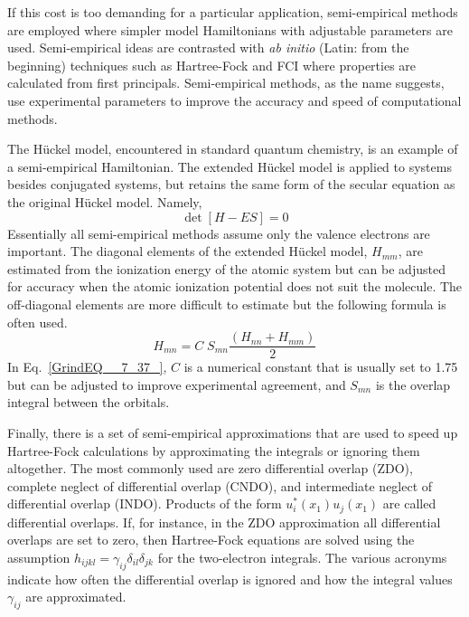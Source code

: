 \documentclass[11pt,oneside,final]{huthesis}%
\begin{document}
If this cost is too demanding for a particular application, {semi-empirical methods} are employed where simpler model Hamiltonians with adjustable parameters are used.  Semi-empirical ideas are contrasted with \textit{ab initio} (Latin: from the beginning) techniques such as Hartree-Fock and FCI where properties are calculated from first principals.  Semi-empirical methods, as the name suggests, use experimental parameters to improve the accuracy and speed of computational methods.

 The H\"uckel model, encountered in standard quantum chemistry, is an example of a semi-empirical Hamiltonian.  The extended H\"uckel model is applied to systems besides conjugated systems, but retains the same form of the secular equation as the original H\"uckel model. Namely,
\begin{equation*}%
\det [H-ES]=0 
\end{equation*} 
Essentially all semi-empirical methods assume only the valence electrons are important.  The diagonal elements of the extended H\"uckel model, $H_{mm} $, are estimated from the ionization energy of the atomic system but can be adjusted for accuracy when the atomic ionization potential does not suit the molecule.  The off-diagonal elements are more difficult to estimate but the following formula is often used.
\begin{equation} \label{GrindEQ__7_37_} 
H_{mn} =C \; S_{mn} \frac{(H_{nn} +H_{mm} )}{2}  
\end{equation} 
In Eq.~\eqref{GrindEQ__7_37_}, $C$ is a numerical constant that is usually set to 1.75 but can be adjusted to improve experimental agreement, and $S_{mn}$ is the overlap integral between the orbitals.

 Finally, there is a set of semi-empirical approximations that are used to speed up Hartree-Fock calculations by approximating the integrals or ignoring them altogether.  The most commonly used are zero differential overlap (ZDO), complete neglect of differential overlap (CNDO), and intermediate neglect of differential overlap (INDO).  Products of the form $u_{i}^{*} (x_{1} )u_{j} (x_{1} )$ are called differential overlaps.  If, for instance, in the ZDO approximation all differential overlaps are set to zero, then Hartree-Fock equations are solved using the assumption $h_{ijkl} =\gamma _{ij} \delta _{il} \delta _{jk} $ for the two-electron integrals.  The various acronyms indicate how often the differential overlap is ignored and how the integral values $\gamma_{ij}$ are approximated.
\end{document}
